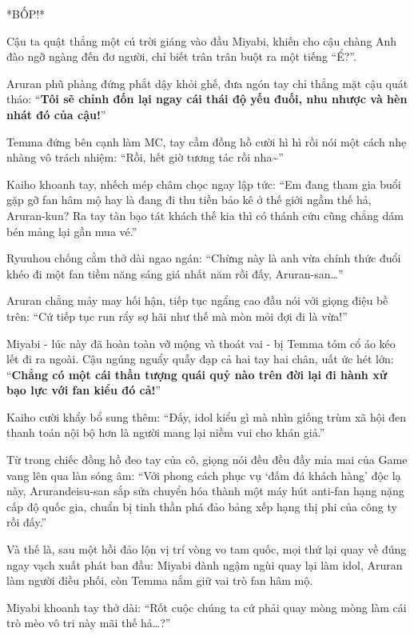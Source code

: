 \documentclass[../main.tex]{subfiles}
\begin{document}
*BỐP!*

Cậu ta quật thẳng một cú trời giáng vào đầu Miyabi, khiến cho cậu chàng Anh đào ngỡ ngàng đến đơ người, chỉ biết trân trân buột ra một tiếng ``Ể?''.


Aruran phũ phàng đứng phắt dậy khỏi ghế, đưa ngón tay chỉ thẳng mặt cậu quát tháo: ``\textbf{Tôi sẽ chỉnh đốn lại ngay cái thái độ yếu đuối, nhu nhược và hèn nhát đó của cậu!}''

Temma đứng bên cạnh làm MC, tay cầm đồng hồ cười hì hì rồi nói một cách nhẹ nhàng vô trách nhiệm: ``Rồi, hết giờ tương tác rồi nha\~{}''

Kaiho khoanh tay, nhếch mép châm chọc ngay lập tức: ``Em đang tham gia buổi gặp gỡ fan hâm mộ hay là đang đi thu tiền bảo kê ở thế giới ngầm thế hả, Aruran-kun? Ra tay tàn bạo tát khách thế kia thì có thánh cứu cũng chẳng dám bén mảng lại gần mua vé.''

Ryuuhou chống cằm thở dài ngao ngán: ``Chừng này là anh vừa chính thức đuổi khéo đi một fan tiềm năng sáng giá nhất năm rồi đấy, Aruran-san\dots''

Aruran chẳng mảy may hối hận, tiếp tục ngẩng cao đầu nói với giọng điệu bề trên: ``Cứ tiếp tục run rẩy sợ hãi như thế mà mòn mỏi đợi đi là vừa!''

Miyabi - lúc này đã hoàn toàn vỡ mộng và thoát vai - bị Temma tóm cổ áo kéo lết đi ra ngoài. Cậu ngúng nguẩy quẫy đạp cả hai tay hai chân, uất ức hét lớn: ``\textbf{Chẳng có một cái thần tượng quái quỷ nào trên đời lại đi hành xử bạo lực với fan kiểu đó cả!}''


Kaiho cười khẩy bổ sung thêm: ``Đấy, idol kiểu gì mà nhìn giống trùm xã hội đen thanh toán nội bộ hơn là người mang lại niềm vui cho khán giả.''

Từ trong chiếc đồng hồ đeo tay của cô, giọng nói đều đều đầy mỉa mai của Game vang lên qua làn sóng âm: ``Với phong cách phục vụ `đấm đá khách hàng' độc lạ này, Arurandeisu-san sắp sửa chuyển hóa thành một máy hút anti-fan hạng nặng cấp độ quốc gia, chuẩn bị tinh thần phá đảo bảng xếp hạng thị phi của công ty rồi đấy.''

\ct

Và thế là, sau một hồi đảo lộn vị trí vòng vo tam quốc, mọi thứ lại quay về đúng ngay vạch xuất phát ban đầu: Miyabi đành ngậm ngùi quay lại làm idol, Aruran làm người điều phối, còn Temma nắm giữ vai trò fan hâm mộ.

Miyabi khoanh tay thở dài: ``Rốt cuộc chúng ta cứ phải quay mòng mòng làm cái trò mèo vô tri này mãi thế hả\dots?''
\end{document}
